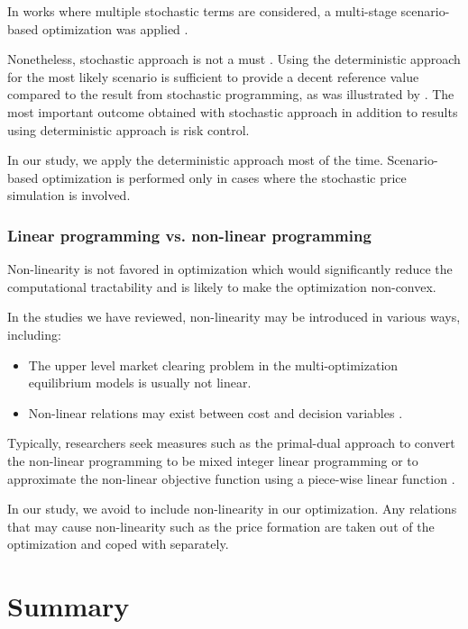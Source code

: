 In works where multiple stochastic terms are considered, a multi-stage scenario-based optimization was applied \cite{Alipour2017,Han2017}.

Nonetheless, stochastic approach is not a must \cite{Zucker2013}. Using the deterministic approach for the most likely scenario is sufficient to provide a decent reference value compared to the result from stochastic programming, as was illustrated by \cite{Calvillo2016}. The most important outcome obtained with stochastic approach in addition to results using deterministic approach is risk control. 

In our study, we apply the deterministic approach most of the time. Scenario-based optimization is performed only in cases where the stochastic price simulation is involved.

\subsubsection{Linear programming vs. non-linear programming}

Non-linearity is not favored in optimization which would significantly reduce the computational tractability and is likely to make the optimization non-convex.

In the studies we have reviewed, non-linearity may be introduced in various ways, including:
\begin{itemize}
	\item The upper level market clearing problem in the multi-optimization equilibrium models is usually not linear. \cite{He2012,Mohsenian-Rad2016,HenriquezAuba2017,Vespermann2017,Huang2017} 
	\item Non-linear relations may exist between cost and decision variables \cite{Mahmoudi2017}.
\end{itemize}

Typically, researchers seek measures such as the primal-dual approach to convert the non-linear programming to be mixed integer linear programming \cite{Zhang2016,Storage2015,HenriquezAuba2017,Mohsenian-Rad2016} or to approximate the non-linear objective function using a piece-wise linear function \cite{Mahmoudi2017}.

In our study, we avoid to include non-linearity in our optimization. Any relations that may cause non-linearity such as the price formation are taken out of the optimization and coped with separately.

\section{Summary}

